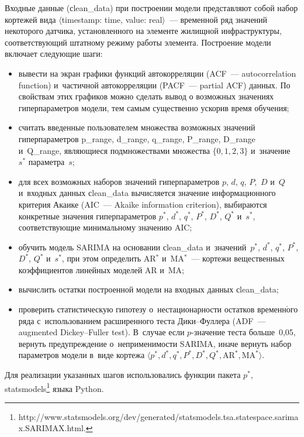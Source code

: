 \begin{multicols}{2}
      Входные данные ({сlean\_data}) при построении модели 
представляют собой набор кортежей вида $\langle${timestamp}: 
{time}, {value}: {real}$\rangle$~--- временной ряд значений 
некоторого датчика, установленного на элементе жилищной инфраструктуры, 
соответствующий штатному режиму работы элемента. Построение модели 
включает следующие шаги:
      \begin{itemize}
\item вывести на экран графики функций автокорреляции (ACF~--- autocorrelation
function) и~час\-тич\-ной 
автокорреляции (PACF~--- partial ACF) данных. По свойствам этих графиков можно сделать 
вывод о возможных значениях гиперпараметров модели, тем самым 
существенно ускорив время обучения;
\item считать введенные пользователем множества возможных значений 
гиперпараметров {p\_range}, {d\_range}, {q\_range}, 
{P\_range}, {D\_range} и~{Q\_range}, являющиеся 
подмножествами множества $\{0, 1, 2, 3\}$ и~значение~$s^*$ параметра~$s$;
\item для всех возможных наборов значений гиперпараметров $p$, $d$, $q$, 
$P,$ $D$ и~$Q$ и~входных данных {сlean\_data} вычисляется значение 
информационного критерия Акаике (AIC~--- Akaike information
criterion), выбираются конкретные значения 
гиперпараметров $p^*$, $d^*$, $q^*$, $P^*$, $D^*$, $Q^*$ и~$s^*$, 
соответствующие минимальному значению AIC;
\item обучить модель SARIMA на основании {сlean\_data} 
и~значений~$p^*$, $d^*$, $q^*$, $P^*$, $D^*$, $Q^*$ и~$s^*$,  при этом 
определить AR$^*$ и~MA$^*$~--- кортежи вещественных коэффициентов 
линейных моделей AR и~MA;
\item вычислить остатки построенной модели на входных данных 
{сlean\_data};
\item проверить статистическую гипотезу о~нестационарности остатков 
временн$\acute{\mbox{о}}$го ряда с~использованием расширенного теста Ди\-ки--Фул\-ле\-ра 
(ADF~--- augmented Dickey--Fuller test). 
В~случае если $p$-зна\-че\-ние теста больше~0,05, вернуть 
предупреждение о~неприменимости SARIMA, иначе вернуть набор 
параметров модели в~виде кортежа $\langle p^*, d^*, q^*, P^*, D^*, Q^*, 
\mathrm{AR}^*, \mathrm{MA}^*\rangle$.
      \end{itemize}
      
      Для реализации указанных шагов использовались функции пакета $p^*$, 
{statsmodels}\footnote{{\sf 
http://www.statsmodels.org/dev/generated/statsmodels.tsa.statespace.sarimax.SARIMAX.html}.} языка Python.
      

\end{multicols}
